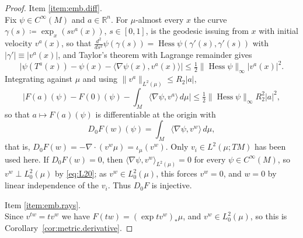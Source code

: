 \documentclass[11pt,reqno]{amsart}
\theoremstyle{plain}
\theoremstyle{definition}
\newcommand{\R}{\mathbb{R}}
\DeclareMathOperator{\Hess}{Hess}
\begin{document}
\begin{proof}
    \noindent Item \ref{item:emb.diff}. \\
    Fix \( \psi\in C^\infty(M) \) and \( a\in\R^n \).
    For \( \mu \)-almost every \( x \) the curve \( \gamma(s)\coloneqq\exp_x(sv^a(x)) \), \( s\in[0,1] \), is the geodesic issuing from \( x \) with initial velocity \( v^a(x) \), so that \( \tfrac{d^2}{ds^2}\psi(\gamma(s))=\Hess\psi(\gamma'(s),\gamma'(s)) \) with \( \lvert\gamma'\rvert\equiv\lvert v^a(x)\rvert \), and Taylor's theorem with Lagrange remainder gives
    \[
        \Big\lvert\psi\left(T^a(x)\right)-\psi(x)-\big\langle\nabla\psi(x),v^a(x)\big\rangle\Big\rvert
        \le\tfrac12\lVert\Hess\psi\rVert_\infty\lvert v^a(x)\rvert^2 .
    \]
    Integrating against \( \mu \) and using \( \lVert v^a\rVert_{L^2(\mu)}\le R_2\lvert a\rvert \),
    \[
        \Big\lvert F(a)(\psi)-F(0)(\psi)-\int_M\big\langle\nabla\psi,v^a\big\rangle\,d\mu\Big\rvert
        \le\tfrac12\lVert\Hess\psi\rVert_\infty R_2^2\lvert a\rvert^2 ,
    \]
    so that \( a\mapsto F(a)(\psi) \) is differentiable at the origin with
    \begin{equation}\label{eq:embedding.differential}
        D_0F(w)(\psi)=\int_M\big\langle\nabla\psi,v^w\big\rangle\,d\mu ,
    \end{equation}
    that is, \( D_0F(w)=-\nabla\!\cdot(v^w\mu)=\iota_\mu(v^w) \).
    Only \( v_i\in L^2(\mu;TM) \) has been used here.
    If \( D_0F(w)=0 \), then \( \langle\nabla\psi,v^w\rangle_{L^2(\mu)}=0 \) for every \( \psi\in C^\infty(M) \), so \( v^w\perp L^2_0(\mu) \) by \eqref{eq:L20}; as \( v^w\in L^2_0(\mu) \), this forces \( v^w=0 \), and \( w=0 \) by linear independence of the \( v_i \).
    Thus \( D_0F \) is injective.
    
    \medskip
    \noindent Item \ref{item:emb.rays}. \\
    Since \( v^{tw}=tv^w \) we have \( F(tw)=(\exp tv^w)_\ast\mu \), and \( v^w\in L^2_0(\mu) \), so this is Corollary~\ref{cor:metric.derivative}.


\end{proof}
\end{document}

